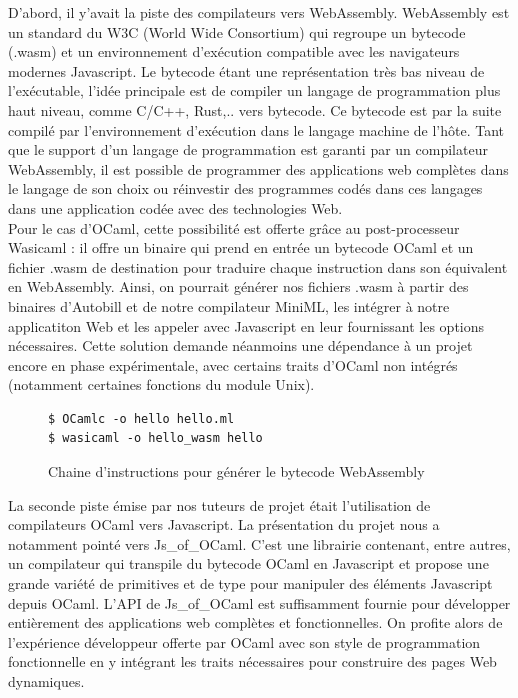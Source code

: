 \documentclass[12pt]{article}
\begin{document}
D'abord, il y'avait la piste des compilateurs vers WebAssembly. WebAssembly est un standard du W3C (World Wide Consortium) qui regroupe un bytecode (.wasm) et un environnement d'exécution compatible avec les navigateurs modernes Javascript. Le bytecode étant une représentation très bas niveau de l'exécutable, l'idée principale est de compiler un langage de programmation plus haut niveau, comme C/C++, Rust,.. vers bytecode. Ce bytecode est par la suite compilé par l'environnement d'exécution dans le langage machine de l'hôte. Tant que le support d'un langage de programmation est garanti par un compilateur WebAssembly, il est possible de programmer des applications web complètes dans le langage de son choix ou réinvestir des programmes codés dans ces langages dans une application codée avec des technologies Web. \\
Pour le cas d'OCaml, cette possibilité est offerte grâce au post-processeur Wasicaml : il offre un binaire qui prend en entrée un bytecode OCaml et un fichier .wasm de destination pour traduire chaque instruction dans son équivalent en WebAssembly. Ainsi, on pourrait générer nos fichiers .wasm à partir des binaires d'Autobill et de notre compilateur MiniML, les intégrer à notre applicatiton Web et les appeler avec Javascript en leur fournissant les options nécessaires. Cette solution demande néanmoins une dépendance à un projet encore en phase expérimentale, avec certains traits d'OCaml non intégrés (notamment certaines fonctions du module Unix).\\
\begin{figure}
      \begin{lstlisting}
$ OCamlc -o hello hello.ml
$ wasicaml -o hello_wasm hello
\end{lstlisting}
      \caption{Chaine d'instructions pour générer le bytecode WebAssembly}
\end{figure}

La seconde piste émise par nos tuteurs de projet était l'utilisation de compilateurs OCaml vers Javascript. La présentation du projet nous a notamment pointé vers Js\_of\_OCaml. C'est une librairie contenant, entre autres, un compilateur qui transpile du bytecode OCaml en Javascript et propose une grande variété de primitives et de type pour manipuler des éléments Javascript depuis OCaml. L'API de Js\_of\_OCaml est suffisamment fournie pour développer entièrement des applications web complètes et fonctionnelles. On profite alors de l'expérience développeur offerte par OCaml avec son style de programmation fonctionnelle en y intégrant les traits nécessaires pour construire des pages Web dynamiques.\\
\end{document}
